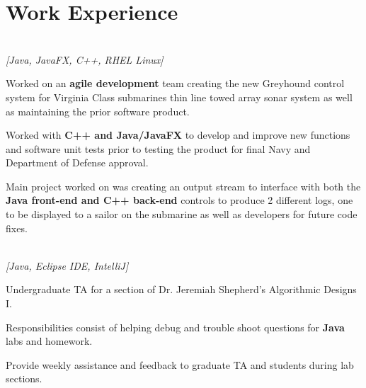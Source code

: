 \documentclass[letterpaper]{deedy-resume}
\begin{document}
\begin{minipage}[t]{0.69\textwidth} 

\section{Work Experience}

 \\  \emph{[Java, JavaFX, C++, RHEL Linux]}\\

\vspace{\topsep} 
\begin{tightitemize}
\item Worked on an \textbf{agile development} team creating the new Greyhound control system for Virginia Class submarines thin line towed array sonar system as well as maintaining the prior software product.
\item Worked with \textbf{C++ and Java/JavaFX} to develop and improve new functions and software unit tests prior to testing the product for final Navy and Department of Defense approval. 
\item Main project worked on was creating an output stream to interface with both the \textbf{Java front-end and C++ back-end} controls to produce 2 different logs, one to be displayed to a sailor on the submarine as well as developers for future code fixes.
\end{tightitemize}

\sectionspace

 \\
 \color{gray} \emph{[Java, Eclipse IDE, IntelliJ]}\\

\vspace{\topsep} 
\begin{tightitemize}
\item Undergraduate TA for a section of Dr. Jeremiah Shepherd's Algorithmic Designs I.
\item Responsibilities consist of helping debug and trouble shoot questions for \textbf{Java} labs and homework.
\item Provide weekly assistance and feedback to graduate TA and students during lab sections.
\end{tightitemize}



\end{minipage}
\end{document}
